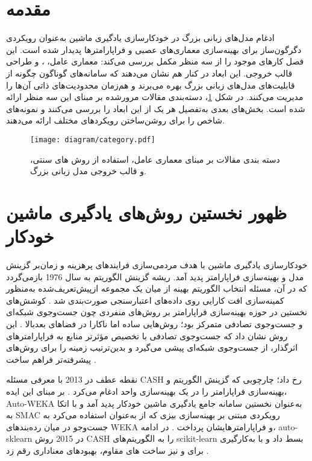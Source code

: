 \section{مقدمه}
ادغام مدل‌های زبانی بزرگ در خودکارسازی یادگیری ماشین به‌عنوان رویکردی دگرگون‌ساز برای بهینه‌سازی معماری‌های عصبی و فراپارامترها پدیدار شده است. این فصل کارهای موجود را از سه منظر مکمل بررسی می‌کند: معماری عامل، ، و طراحی قالب خروجی. این ابعاد در کنار هم نشان می‌دهند که سامانه‌های گوناگون چگونه از قابلیت‌های مدل‌های زبانی بزرگ بهره می‌برند و هم‌زمان محدودیت‌های ذاتی آن‌ها را مدیریت می‌کنند.
در شکل \ref{fig:category}، دسته‌بندی مقالات مرورشده بر مبنای این سه منظر ارائه شده است. بخش‌های بعدی به‌تفصیل هر یک از این ابعاد را بررسی می‌کنند و نمونه‌های شاخص را برای روشن‌ساختن رویکردهای مختلف ارائه می‌دهند.
\begin{figure}[h!]
    \centering
    \texttt{[image: diagram/category.pdf]}
    \caption[دسته بندی مقالات]{
        دسته بندی مقالات بر مبنای معماری عامل، استفاده از روش های سنتی، و قالب خروجی مدل زبانی بزرگ.
    }
    \label{fig:category}

\end{figure}
\section{ظهور نخستین روش‌های یادگیری ماشین خودکار}
خودکارسازی یادگیری ماشین با هدف مردمی‌سازی فرایندهای پرهزینه و زمان‌بر گزینش مدل و بهینه‌سازی فراپارامتر پدید آمد. ریشه گزینش الگوریتم به سال 1976 بازمی‌گردد که در آن، مسئله انتخاب الگوریتم بهینه از میان یک مجموعه ازپیش‌تعریف‌شده به‌منظور کمینه‌سازی افت کارایی روی داده‌های اعتبارسنجی صورت‌بندی شد \cite{RICE197665}. کوشش‌های نخستین در حوزه بهینه‌سازی فراپارامتر بر روش‌های منفردی چون جست‌وجوی شبکه‌ای و جست‌وجوی تصادفی متمرکز بود؛ روش‌هایی ساده اما ناکارا در فضاهای بعدبالا \cite{JMLR:v13:bergstra12a}. این روش نشان داد که جست‌وجوی تصادفی با تخصیص مؤثرتر منابع به فراپارامترهای اثرگذار، از جست‌وجوی شبکه‌ای پیشی می‌گیرد و بدین‌ترتیب زمینه را برای روش‌های پیشرفته‌تر فراهم ساخت \cite{JMLR:v13:bergstra12a}.

نقطه عطف در 2013 با معرفی مسئله CASH رخ داد؛ چارچوبی که گزینش الگوریتم و بهینه‌سازی فراپارامتر را در یک بهینه‌سازی واحد ادغام می‌کرد \cite{10.1145/2487575.2487629}. بر مبنای این ایده، Auto-WEKA به‌عنوان نخستین سامانه جامع یادگیری ماشین خودکار پدید آمد و با اتکا به SMAC   رویکردی مبتنی بر بهینه‌سازی بیزی که از  به‌عنوان  استفاده می‌کرد   به جست‌وجو در میان رده‌بندهای WEKA و فراپارامترهایشان پرداخت \cite{10.1145/2487575.2487629, 10.1007/978-3-642-25566-3_40}. در ادامه، auto-sklearn در 2015 روش CASH را به الگوریتم‌های scikit-learn بسط داد و با به‌کارگیری  برای  و نیز ساخت ‌های مقاوم، بهبودهای معناداری رقم زد \cite{NIPS2015_11d0e628}.

